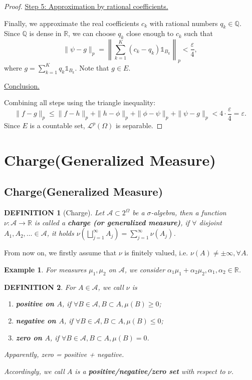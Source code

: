 \documentclass[12pt]{article}
\theoremstyle{blueplain}
\theoremstyle{bluedef}
\newtheorem{definition}{DEFINITION}[section]
\theoremstyle{blueremark}
\newtheorem{example}{Example}[section]
\newcommand{\R}{\mathbb{R}}
\numberwithin{equation}{section}
\begin{document}
\begin{proof}
  \underline{Step 5: Approximation by rational coefficients.}

  Finally, we approximate the real coefficients $c_k$ with rational numbers $q_k \in \mathds{Q}$. Since $\mathds{Q}$ is dense in $\mathds{R}$, we can choose $q_k$ close enough to $c_k$ such that
  \[
    \| \psi - g \|_p = \left\| \sum_{k=1}^K (c_k - q_k) \mathds{1}_{B_k} \right\|_p < \frac{\varepsilon}{4},
  \]
  where $g = \sum_{k=1}^K q_k \mathds{1}_{B_k}$. Note that $g \in E$.

  \underline{Conclusion.}

  Combining all steps using the triangle inequality:
  \[
    \|f - g\|_p \le \|f - h\|_p + \|h - \phi\|_p + \|\phi - \psi\|_p + \|\psi - g\|_p < 4 \cdot \frac{\varepsilon}{4} = \varepsilon.
  \]
  Since $E$ is a countable set, $\mathcal{L}^p(\Omega)$ is separable.
\end{proof}

\clearpage

\section{Charge(Generalized Measure)}

\clearpage

\subsection{Charge(Generalized Measure)}

\begin{definition}[Charge]
  Let $\mathcal{A} \subset 2^\Omega$ be a $\sigma$-algebra, then a function $\nu: \mathcal{A} \rightarrow \R$ is called a \textbf{charge (or generalized measure)}, if $\forall$ disjoint $A_1, A_2, \ldots \in \mathcal{A}$, it holds $\nu(\bigsqcup_{j=1}^\infty A_j) = \sum_{j=1}^\infty \nu(A_j)$.
\end{definition}

From now on, we firstly assume that $\nu$ is finitely valued, i.e. $\nu(A) \neq \pm \infty, \forall A$.

\begin{example}
  For measures $\mu_1, \mu_2$ on $\mathcal{A}$, we consider $\alpha_1 \mu_1 + \alpha_2 \mu_2, \alpha_1, \alpha_2 \in \R$.
\end{example}

\begin{definition}
  For $A \in \mathcal{A}$, we call $\nu$ is
  \begin{enumerate}
    \item \textbf{positive on $A$}, if $\forall B \in \mathcal{A}, B \subset A, \mu(B) \geq 0$;
    \item \textbf{negative on $A$}, if $\forall B \in \mathcal{A}, B \subset A, \mu(B) \leq 0$;
    \item \textbf{zero on $A$}, if $\forall B \in \mathcal{A}, B \subset A, \mu(B) = 0$.
  \end{enumerate}

  Apparently, zero = positive + negative.

  Accordingly, we call $A$ is a \textbf{positive/negative/zero set} with respect to $\nu$.
\end{definition}
\end{document}
